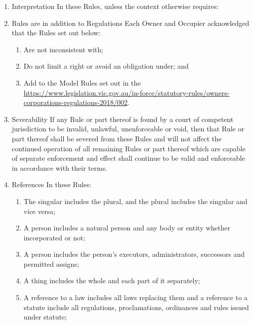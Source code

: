\documentclass{article}
\begin{document}
\begin{enumerate}[label=\arabic*.]
\begin{enumerate}[label=\arabic{enumi}.\arabic*.]
\item  Interpretation In these Rules, unless the context otherwise requires:

\item  Rules are in addition to Regulations Each Owner and Occupier acknowledged that the Rules set out below:
\newpage



\begin{enumerate}[label=(\arabic*)]

\item  Are not inconsistent with;

\item  Do not limit a right or avoid an obligation under; and

\item  Add to the Model Rules set out in the \href{Owners Corporations Regulations}{https://www.legislation.vic.gov.au/in-force/statutory-rules/owners-corporations-regulations-2018/002}.

\end{enumerate}

\item  Severability If any Rule or part thereof is found by a court of competent jurisdiction to be invalid, unlawful, unenforceable or void, then that Rule or part thereof shall be severed from these Rules and will not affect the continued operation of all remaining Rules or part thereof which are capable of separate enforcement and effect shall continue to be valid and enforceable in accordance with their terms.

\item  References In these Rules:

\begin{enumerate}[label=(\arabic*)]

\item  The singular includes the plural, and the plural includes the singular and vice versa;

\item  A person includes a natural person and any body or entity whether incorporated or not;

\item  A person includes the person’s executors, administrators, successors and permitted assigns;

\item  A thing includes the whole and each part of it separately;

\item  A reference to a law includes all laws replacing them and a reference to a statute include all regulations, proclamations, ordinances and rules issued under statute;


\end{enumerate}
\end{enumerate}
\end{enumerate}
\end{document}
